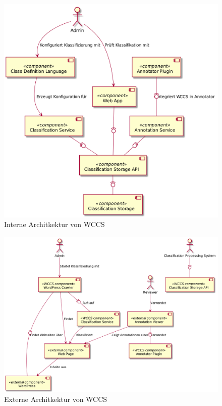         \begin{figure}
            \centering
            \includegraphics[width=\textwidth]{../resources/architecture/wccs_internal_architecture.png}
            \caption{Interne Architkektur von WCCS}
            \label{image:wccsInternalArchitecture}
        \end{figure}

        \begin{figure}
            \centering
            \includegraphics[width=\textwidth]{../resources/architecture/external_architecture.png}
            \caption{Externe Architkektur von WCCS}
            \label{image:wccsExternalArchitecture}
        \end{figure}